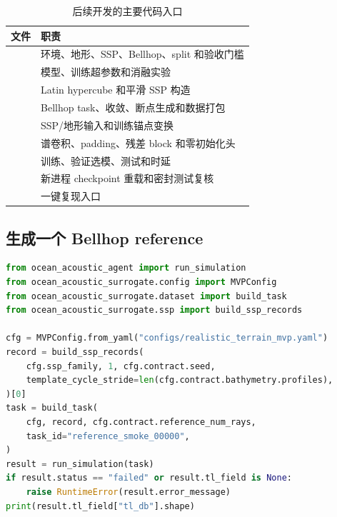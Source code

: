 \documentclass[UTF8,11pt]{ctexart}
\begin{document}
\begin{table}[H]
\centering
\caption{后续开发的主要代码入口}
\begin{tabularx}{\textwidth}{L{5.2cm}Y}
\toprule
文件 & 职责 \\
\midrule
{} & 环境、地形、SSP、Bellhop、split 和验收门槛 \\
 & 模型、训练超参数和消融实验 \\
 & Latin hypercube 和平滑 SSP 构造 \\
 & Bellhop task、收敛、断点生成和数据打包 \\
 & SSP/地形输入和训练锚点变换 \\
 & 谱卷积、padding、残差 block 和零初始化头 \\
 & 训练、验证选模、测试和时延 \\
 & 新进程 checkpoint 重载和密封测试复核 \\
 & 一键复现入口 \\
\bottomrule
\end{tabularx}
\end{table}

\subsection{生成一个 Bellhop reference}

\begin{lstlisting}[style=repro,language=Python]
from ocean_acoustic_agent import run_simulation
from ocean_acoustic_surrogate.config import MVPConfig
from ocean_acoustic_surrogate.dataset import build_task
from ocean_acoustic_surrogate.ssp import build_ssp_records

cfg = MVPConfig.from_yaml("configs/realistic_terrain_mvp.yaml")
record = build_ssp_records(
    cfg.ssp_family, 1, cfg.contract.seed,
    template_cycle_stride=len(cfg.contract.bathymetry.profiles),
)[0]
task = build_task(
    cfg, record, cfg.contract.reference_num_rays,
    task_id="reference_smoke_00000",
)
result = run_simulation(task)
if result.status == "failed" or result.tl_field is None:
    raise RuntimeError(result.error_message)
print(result.tl_field["tl_db"].shape)
\end{lstlisting}
\end{document}
